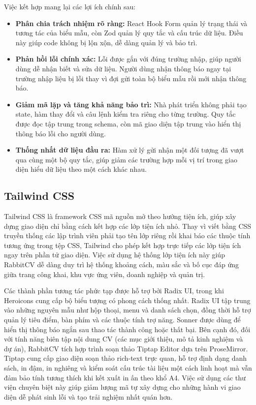 Việc kết hợp mang lại các lợi ích chính sau:

\begin{itemize}
    \item \textbf{Phân chia trách nhiệm rõ ràng:} React Hook Form quản lý trạng thái và tương tác của biểu mẫu, còn Zod quản lý quy tắc và cấu trúc dữ liệu. Điều này giúp code không bị lộn xộn, dễ dàng quản lý và bảo trì.

    \item \textbf{Phản hồi lỗi chính xác:} Lỗi được gắn với đúng trường nhập, giúp người dùng dễ nhận biết và sửa dữ liệu. Người dùng nhận thông báo ngay tại trường nhập liệu bị lỗi thay vì đợi gửi toàn bộ biểu mẫu rồi mới nhận thông báo.

    \item \textbf{Giảm mã lặp và tăng khả năng bảo trì:} Nhà phát triển không phải tạo state, hàm thay đổi và câu lệnh kiểm tra riêng cho từng trường. Quy tắc được đọc tập trung trong schema, còn mã giao diện tập trung vào hiển thị thông báo lỗi cho người dùng.

    \item \textbf{Thống nhất dữ liệu đầu ra:} Hàm xử lý gửi nhận một đối tượng đã vượt qua cùng một bộ quy tắc, giúp giảm các trường hợp mỗi vị trí trong giao diện hiểu dữ liệu theo một cách khác nhau.
\end{itemize}

\subsection{Tailwind CSS}

Tailwind CSS là framework CSS mã nguồn mở theo hướng tiện ích, giúp xây dựng giao diện chỉ bằng cách kết hợp các lớp tiện ích nhỏ. Thay vì viết bằng CSS truyền thống các lập trình viên phải tạo tên lớp riêng rồi khai báo các thuộc tính tương ứng trong tệp CSS, Tailwind cho phép kết hợp trực tiếp các lớp tiện ích ngay trên phần tử giao diện. Việc sử dụng hệ thống lớp tiện ích này giúp RabbitCV dễ dàng duy trì hệ thống khoảng cách, màu sắc và bố cục đáp ứng giữa trang công khai, khu vực ứng viên, doanh nghiệp và quản trị.

Các thành phần tương tác phức tạp được hỗ trợ bởi Radix UI, trong khi Heroicons cung cấp bộ biểu tượng có phong cách thống nhất. Radix UI tập trung vào những nguyên mẫu như hộp thoại, menu và danh sách chọn, đồng thời hỗ trợ quản lý tiêu điểm, bàn phím và các thuộc tính trợ năng. Sonner được dùng để hiển thị thông báo ngắn sau thao tác thành công hoặc thất bại. Bên cạnh đó, đối với tính năng biên tập nội dung CV (các mục giới thiệu, mô tả kinh nghiệm và dự án), RabbitCV tích hợp trình soạn thảo Tiptap Editor dựa trên ProseMirror. Tiptap cung cấp giao diện soạn thảo rich-text trực quan, hỗ trợ định dạng danh sách, in đậm, in nghiêng và kiểm soát cấu trúc tài liệu một cách linh hoạt mà vẫn đảm bảo tính tương thích khi kết xuất in ấn theo khổ A4. Việc sử dụng các thư viện chuyên biệt này giúp giảm lượng mã tự xây dựng cho những hành vi giao diện dễ phát sinh lỗi và tạo trải nghiệm nhất quán hơn.

